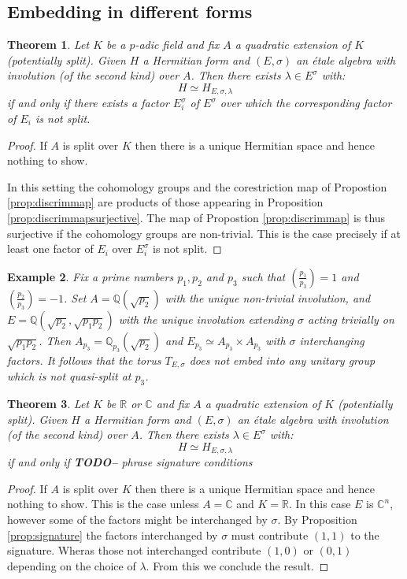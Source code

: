 \documentclass{article}
\theoremstyle{plain}
\newtheorem{theorem}{Theorem}[section]
\newtheorem{example}[theorem]{Example}
\theoremstyle{definition}
\numberwithin{equation}{section}
\newcommand{\RR}{\mathbb{R}}
\newcommand{\CC}{\mathbb{C}}
\newcommand{\QQ}{\mathbb{Q}}
\newcommand{\TODO}[1]{\textbf{TODO-#1}}
\begin{document}
\subsection{Embedding in different forms}

\begin{theorem}
Let $K$ be a $p$-adic field and fix $A$ a quadratic extension of $K$ (potentially split).
Given $H$ a Hermitian form and $(E,\sigma)$ an \'etale algebra with involution (of the second kind) over $A$. Then there exists $\lambda \in E^\sigma$ with:
\[ H \simeq H_{E,\sigma,\lambda} \]
if and only if there exists a factor $E_i^\sigma$ of $E^\sigma$ over which the corresponding factor of $E_i$ is not split.
\end{theorem}
\begin{proof}
If $A$ is split over $K$ then there is a unique Hermitian space and hence nothing to show.

In this setting the cohomology groups and the corestriction map of Propostion \ref{prop:discrimmap} are products of those appearing in Proposition \ref{prop:discrimmapsurjective}. The map of Propostion \ref{prop:discrimmap} is thus surjective if the cohomology groups are non-trivial. This is the case precisely if at least one factor of $E_i$ over $E_i^\sigma$ is not split.
\end{proof}

\begin{example}
Fix a prime numbers $p_1,p_2$ and $p_3$ such that $\left(\tfrac{p_1}{p_3}\right) = 1$ and $\left(\tfrac{p_2}{p_3}\right) = -1$.
Set $A=\QQ(\sqrt{p_2})$ with the unique non-trivial involution, and $E=\QQ(\sqrt{p_2},\sqrt{p_1p_2})$ with the unique involution extending $\sigma$ acting trivially on $\sqrt{p_1p_2}$.
Then $A_{p_3} = \QQ_{p_3}(\sqrt{p_2})$ and $E_{p_3} \simeq A_{p_3} \times A_{p_3}$ with $\sigma$ interchanging factors.
It follows that the torus $T_{E,\sigma}$ does not embed into any unitary group which is not quasi-split at $p_3$.
\end{example}

\begin{theorem}
Let $K$ be $\RR$ or $\CC$ and fix $A$ a quadratic extension of $K$ (potentially split).
Given $H$ a Hermitian form and $(E,\sigma)$ an \'etale algebra with involution (of the second kind) over $A$. Then there exists $\lambda \in E^\sigma$ with:
\[ H \simeq H_{E,\sigma,\lambda} \]
if and only if 
\TODO - phrase signature conditions
\end{theorem}
\begin{proof}
If $A$ is split over $K$ then there is a unique Hermitian space and hence nothing to show.
This is the case unless $A=\CC$ and $K=\RR$. In this case $E$ is $\CC^n$, however some of the factors might be interchanged by $\sigma$.
By Proposition \ref{prop:signature} the factors interchanged by $\sigma$ must contribute $(1,1)$ to the signature.
Wheras those not interchanged contribute $(1,0)$ or $(0,1)$ depending on the choice of $\lambda$.
From this we conclude the result.
\end{proof}
\end{document}
